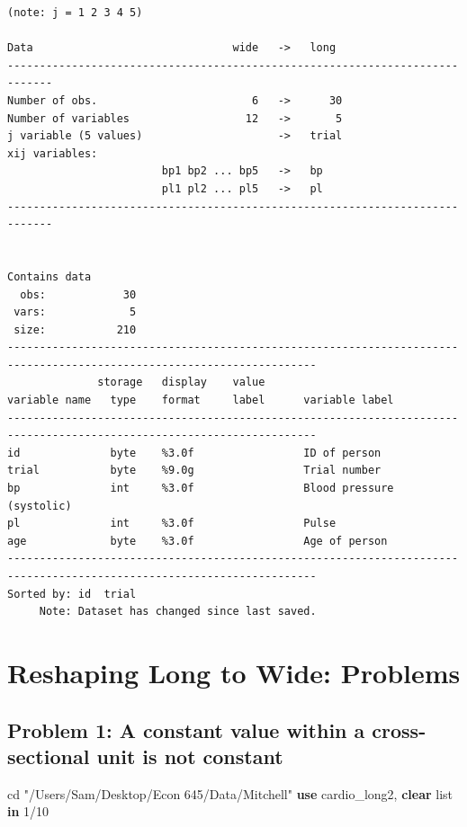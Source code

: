 \documentclass[
]{book}
\newenvironment{Shaded}{\begin{snugshade}}{\end{snugshade}}
\newcommand{\KeywordTok}[1]{\textcolor[rgb]{0.13,0.29,0.53}{\textbf{#1}}}
\newcommand{\NormalTok}[1]{#1}
\newcommand{\OtherTok}[1]{\textcolor[rgb]{0.56,0.35,0.01}{#1}}
\newcommand{\StringTok}[1]{\textcolor[rgb]{0.31,0.60,0.02}{#1}}
\begin{document}
\begin{verbatim}
(note: j = 1 2 3 4 5)

Data                               wide   ->   long
-----------------------------------------------------------------------------
Number of obs.                        6   ->      30
Number of variables                  12   ->       5
j variable (5 values)                     ->   trial
xij variables:
                        bp1 bp2 ... bp5   ->   bp
                        pl1 pl2 ... pl5   ->   pl
-----------------------------------------------------------------------------


Contains data
  obs:            30                          
 vars:             5                          
 size:           210                          
----------------------------------------------------------------------------------------------------------------------
              storage   display    value
variable name   type    format     label      variable label
----------------------------------------------------------------------------------------------------------------------
id              byte    %3.0f                 ID of person
trial           byte    %9.0g                 Trial number
bp              int     %3.0f                 Blood pressure (systolic)
pl              int     %3.0f                 Pulse
age             byte    %3.0f                 Age of person
----------------------------------------------------------------------------------------------------------------------
Sorted by: id  trial
     Note: Dataset has changed since last saved.
\end{verbatim}

\section{Reshaping Long to Wide: Problems}\label{reshaping-long-to-wide-problems}

\subsection*{Problem 1: A constant value within a cross-sectional unit is not constant}\label{problem-1-a-constant-value-within-a-cross-sectional-unit-is-not-constant}

\begin{Shaded}
\begin{Highlighting}[]
\NormalTok{cd }\StringTok{"/Users/Sam/Desktop/Econ 645/Data/Mitchell"}
\KeywordTok{use}\NormalTok{ cardio\_long2, }\KeywordTok{clear}
\OtherTok{list} \KeywordTok{in}\NormalTok{ 1/10}
\end{Highlighting}
\end{Shaded}
\end{document}
